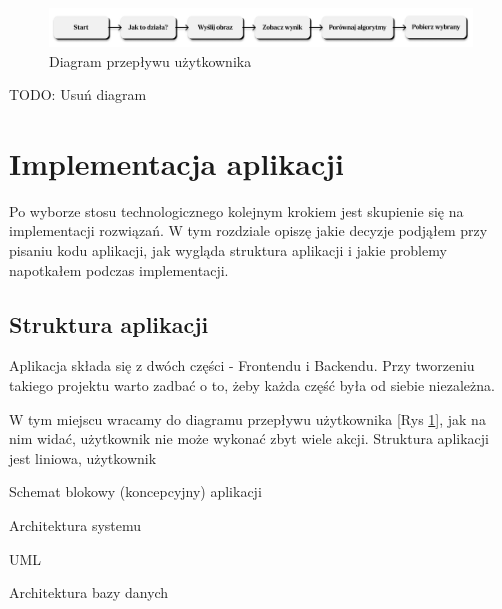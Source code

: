 \begin{figure}[ht]
    \centering
    \includegraphics[width=\linewidth]{Rozdziały/06.Aplikacja/Obrazy/user-flow.png}  
    \caption{Diagram przepływu użytkownika}
    \label{fig:image82}
\end{figure}

TODO: Usuń diagram

\section{Implementacja aplikacji}

Po wyborze stosu technologicznego kolejnym krokiem jest skupienie się na implementacji rozwiązań. W tym rozdziale opiszę jakie decyzje podjąłem przy pisaniu kodu aplikacji, jak wygląda struktura aplikacji i jakie problemy napotkałem podczas implementacji.

\subsection*{Struktura aplikacji}

Aplikacja składa się z dwóch części - Frontendu i Backendu. Przy tworzeniu takiego projektu warto zadbać o to, żeby każda część była od siebie niezależna. 

W tym miejscu wracamy do diagramu przepływu użytkownika [Rys \ref{fig:image82}], jak na nim widać, użytkownik nie może wykonać zbyt wiele akcji. Struktura aplikacji jest liniowa, użytkownik 





Schemat blokowy (koncepcyjny) aplikacji

Architektura systemu   

UML

Architektura bazy danych



